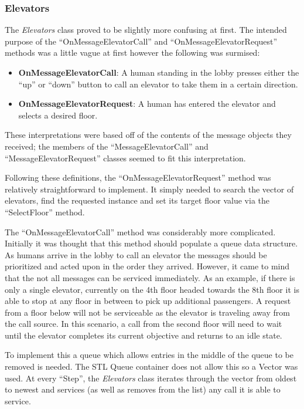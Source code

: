 \documentclass{article}
\begin{document}
\subsubsection{Elevators}
The \textit{Elevators} class proved to be slightly more confusing at first.
The intended purpose of the ``OnMessageElevatorCall'' and ``OnMessageElevatorRequest'' methods was a little vague at first however the following was surmised:
\begin{itemize}
	\item \textbf{OnMessageElevatorCall}: A human standing in the lobby presses either the ``up'' or ``down'' button to call an elevator to take them in a certain direction.
	\item \textbf{OnMessageElevatorRequest}: A human has entered the elevator and selects a desired floor.
\end{itemize}
These interpretations were based off of the contents of the message objects they received; the members of the ``MessageElevatorCall'' and ``MessageElevatorRequest'' classes seemed to fit this interpretation.\newline

Following these definitions, the ``OnMessageElevatorRequest'' method was relatively straightforward to implement. 
It simply needed to search the vector of elevators, find the requested instance and set its target floor value via the ``SelectFloor'' method.\newline

The ``OnMessageElevatorCall'' method was considerably more complicated. 
Initially it was thought that this method should populate a queue data structure.
As humans arrive in the lobby to call an elevator the messages should be prioritized and acted upon in the order they arrived. 
However, it came to mind that the not all messages can be serviced immediately.
As an example, if there is only a single elevator, currently on the 4th floor headed towards the 8th floor it is able to stop at any floor in between to pick up additional passengers.
A request from a floor below will not be serviceable as the elevator is traveling away from the call source.
In this scenario, a call from the second floor will need to wait until the elevator completes its current objective and returns to an idle state. 

To implement this a queue which allows entries in the middle of the queue to be removed is needed.
The STL Queue container does not allow this so a Vector was used.
At every ``Step'', the \textit{Elevators} class iterates through the vector from oldest to newest and services (as well as removes from the list) any call it is able to service.\newline
\end{document}
